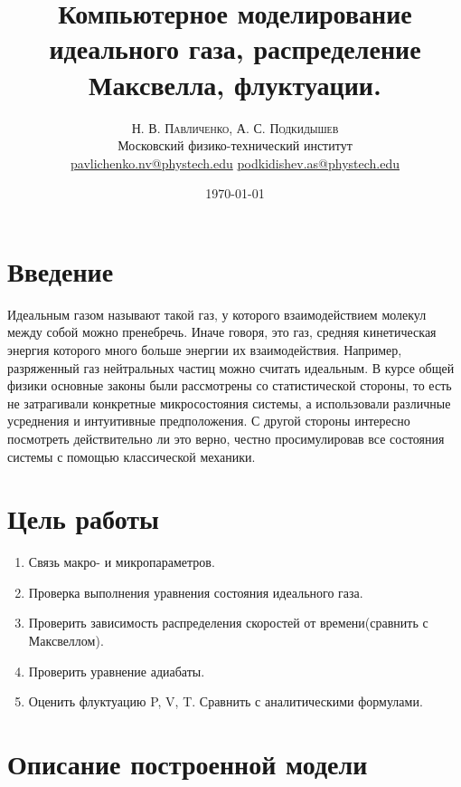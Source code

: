 \documentclass[twoside,twocolumn, 11pt]{article}
\title{Компьютерное моделирование идеального газа, распределение Максвелла, флуктуации.} %
\author{%
\textsc{Н. В. Павличенко, А. С. Подкидышев} \\[1ex] %
\normalsize Московский физико-технический институт \\ %
\normalsize \href{mailto:pavlichenko.nv@phystech.edu}{pavlichenko.nv@phystech.edu}
\href{mailto:pavlichenko.nv@phystech.edu}{podkidishev.as@phystech.edu}%
}
\date{\today} %
\theoremstyle{plain}
\theoremstyle{definition}
\begin{document}
\maketitle
\section{Введение}

\indent Идеальным газом называют такой газ, у которого взаимодействием молекул между собой можно пренебречь. Иначе говоря, это газ,
средняя кинетическая энергия которого много больше энергии их взаимодействия. Например, разряженный газ нейтральных частиц можно считать идеальным.
В курсе общей физики основные законы были рассмотрены со статистической стороны, то есть не затрагивали конкретные микросостояния системы,
а использовали различные усреднения и интуитивные предположения. С другой стороны интересно посмотреть действительно ли это верно, честно просимулировав все состояния
системы с помощью классической механики.

\section{Цель работы}

\begin{enumerate}
\item Связь макро- и микропараметров.
\item Проверка выполнения уравнения состояния идеального газа.
\item Проверить зависимость распределения скоростей от времени(сравнить с Максвеллом).
\item Проверить уравнение адиабаты.
\item Оценить флуктуацию P, V, T. Сравнить с аналитическими формулами.
\end{enumerate}

\section{Описание построенной модели}
\end{document}
